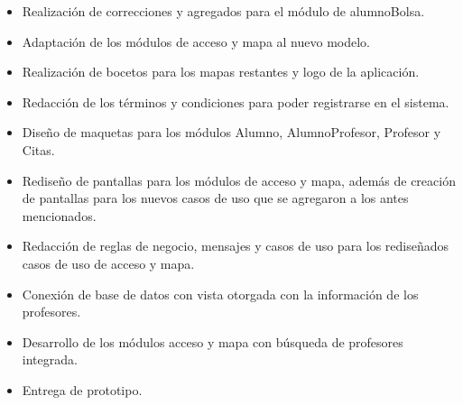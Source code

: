 \begin{itemize}
	\item Realización de correcciones y agregados para el módulo de alumnoBolsa.
	\item Adaptación de los módulos de acceso y mapa al nuevo modelo.
	\item Realización de bocetos para los mapas restantes y logo de la aplicación.
	\item Redacción de los términos y condiciones para poder registrarse en el sistema.
	\item Diseño de maquetas para los módulos Alumno, AlumnoProfesor, Profesor y Citas.
	\item Rediseño de pantallas para los módulos de acceso y mapa, además de creación de pantallas para los nuevos casos de uso que se agregaron a los antes mencionados.
	\item Redacción de reglas de negocio, mensajes y casos de uso para los rediseñados casos de uso de acceso y mapa.
	\item Conexión de base de datos con vista otorgada con la información de los profesores.
	\item Desarrollo de los módulos acceso y mapa con búsqueda de profesores integrada.
	\item Entrega de prototipo.
\end{itemize}

